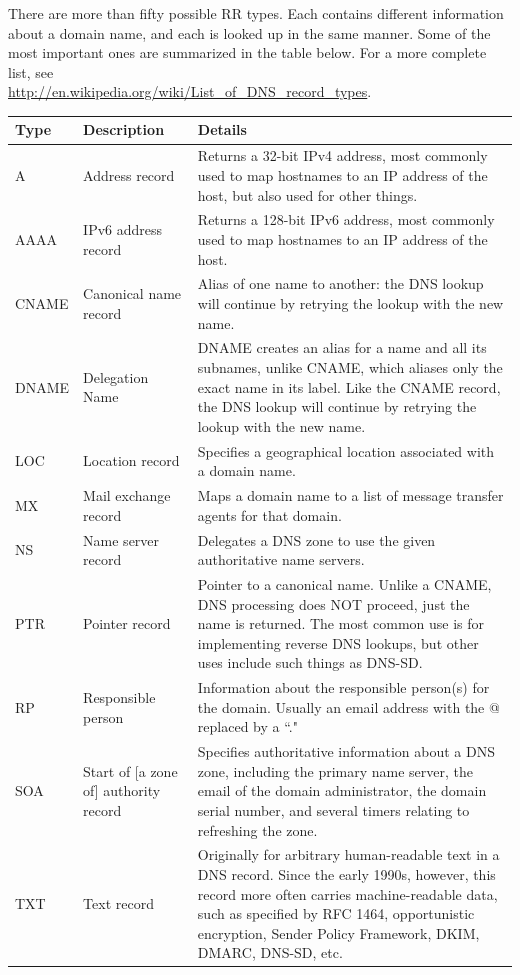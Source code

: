 \documentclass[11pt,a4paper]{article}
\begin{document}
There are more than fifty possible RR types. 
Each contains different information about a domain name, and each is looked up in the same manner.
Some of the most important ones are summarized in the table below.
For a more complete list, see\\ 
\url{http://en.wikipedia.org/wiki/List_of_DNS_record_types}.

\begin{center}
\begin{tabular}{|l|l|p{7cm}|}
\hline
\textbf{Type} & \textbf{Description} & \textbf{Details} \\ \hline
A & Address record & Returns a 32-bit IPv4 address, most commonly used to map hostnames to an IP address of the host, but also used for other things.\\ \hline
AAAA & IPv6 address record & Returns a 128-bit IPv6 address, most commonly used to map hostnames to an IP address of the host.\\ \hline
CNAME & Canonical name record & Alias of one name to another: the DNS lookup will continue by retrying the lookup with the new name. \\ \hline
DNAME & Delegation Name & DNAME creates an alias for a name and all its subnames, unlike CNAME, which aliases only the exact name in its label. Like the CNAME record, the DNS lookup will continue by retrying the lookup with the new name. \\ \hline
LOC & Location record & Specifies a geographical location associated with a domain name. \\ \hline
MX & Mail exchange record & Maps a domain name to a list of message transfer agents for that domain.\\ \hline
NS & Name server record & Delegates a DNS zone to use the given authoritative name servers.\\ \hline
PTR & Pointer record & Pointer to a canonical name. Unlike a CNAME, DNS processing does NOT proceed, just the name is returned. The most common use is for implementing reverse DNS lookups, but other uses include such things as DNS-SD.\\ \hline
RP & Responsible person & Information about the responsible person(s) for the domain. Usually an email address with the @ replaced by a ``."\\ \hline
SOA & Start of [a zone of] authority record & Specifies authoritative information about a DNS zone, including the primary name server, the email of the domain administrator, the domain serial number, and several timers relating to refreshing the zone.\\ \hline
TXT & Text record & Originally for arbitrary human-readable text in a DNS record. Since the early 1990s, however, this record more often carries machine-readable data, such as specified by RFC 1464, opportunistic encryption, Sender Policy Framework, DKIM, DMARC, DNS-SD, etc.\\ 
\hline
\end{tabular}
\end{center} 
\end{document}
